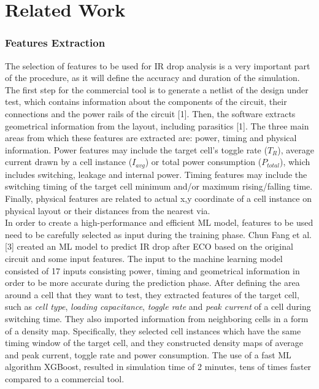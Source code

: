\section{Related Work}
\subsubsection{\textbf{Features Extraction}}

The selection of features to be used for IR drop analysis is a very important part of the procedure, as it will define the accuracy and duration of the simulation. The first step for the commercial tool is to generate a netlist of the design under test, which contains information about the components of the circuit, their connections and the power rails of the circuit [1]. Then, the software extracts geometrical information from the layout, including parasitics [1]. The three main areas from which these features are extracted are: power, timing and physical information. Power features may include the target cell's toggle rate ($T_R$), average current drawn by a cell instance ($I_{avg}$) or total power consumption ($P_{total}$), which includes switching, leakage and internal power. Timing features may include the switching timing of the target cell minimum and/or maximum rising/falling time. Finally, physical features are related to actual x,y coordinate of a cell instance on physical layout or their distances from the nearest via.\\ 

In order to create a high-performance and efficient ML model, features to be used need to be carefully selected as input during the training phase. Chun Fang et al. [3] created an ML model to predict IR drop after ECO based on the original circuit and some input features. The input to the machine learning model consisted of 17 inputs consisting power, timing and geometrical information in order to be more accurate during the prediction phase. After defining the area around a cell that they want to test, they extracted features of the target cell, such as \textit{cell type}, \textit{loading capacitance}, \textit{toggle rate} and \textit{peak current} of a cell during switching time. They also imported information from neighboring cells in a form of a density map. Specifically, they selected cell instances which have the same timing window of the target cell, and they constructed density maps of average and peak current, toggle rate and power consumption. The use of a fast ML algorithm XGBoost, resulted in simulation time of 2 minutes, tens of times faster compared to a commercial tool.\\

